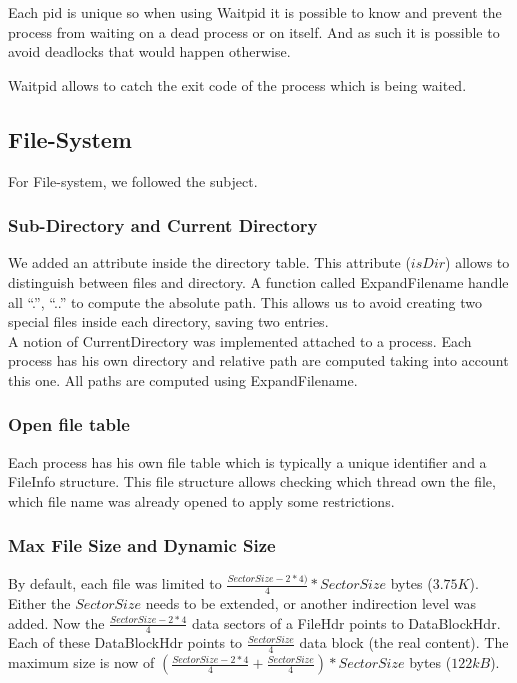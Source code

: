 Each pid is unique so when using Waitpid it is possible to know and prevent the
process from waiting on a dead process or on itself. And as such it is possible
to avoid deadlocks that would happen otherwise.

Waitpid allows to catch the exit code of the process which is being waited.

\subsection{File-System}
For File-system, we followed the subject.

\subsubsection{Sub-Directory and Current Directory}

We added an attribute inside the directory table. This attribute ($isDir$) allows
to distinguish between files and directory. A function called
\textrm{ExpandFilename} handle all ``.'', ``..'' to compute the absolute
path. This allows us to avoid creating two special files inside each directory,
saving two entries.\\

A notion of CurrentDirectory was implemented attached to a process. Each process
has his own directory and relative path are computed taking into account this
one. All paths are computed using ExpandFilename.

\subsubsection{Open file table}
Each process has his own file table which is typically a unique identifier and a
FileInfo structure. This file structure allows checking which thread own the
file, which file name was already opened to apply some restrictions.

\subsubsection{Max File Size and Dynamic Size}
By default, each file was limited to $\frac{SectorSize - 2*4)}{4} * SectorSize$
bytes ($3.75K$). Either the $SectorSize$ needs to be extended, or another
indirection level was added.
Now the $\frac{SectorSize - 2*4}{4}$ data sectors of a FileHdr points to
DataBlockHdr. Each of these DataBlockHdr points to $\frac{SectorSize}{4}$ data
block (the real content).
The maximum size is now of $(\frac{SectorSize - 2*4}{4} +
\frac{SectorSize}{4})*SectorSize$ bytes ($122kB$).\\

